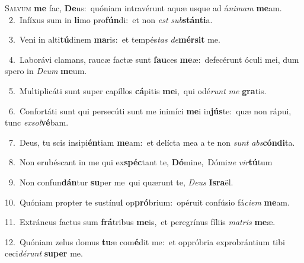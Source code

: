 \lettrine{\initial\textcolor{\initialcolor}{S}}{alvum} \textbf{me} fac, \textbf{De}\-us:~\star quóniam intravérunt aquæ usque ad á\-\textit{ni}\-\textit{mam} \textbf{me}\-am.\\
{\numbfont\textcolor{\numbcolor}{~2.}}~Infíxus sum in \textbf{li}\-mo pro\-\textbf{fún}\-di:~\star et non \textit{est} \textit{sub}\-\textbf{stán}\textbf{ti}a.\par
{\numbfont\textcolor{\numbcolor}{~3.}}~Veni in alti\-\textbf{tú}\-dinem \textbf{ma}\-ris:~\star et tempés\textit{tas} \textit{de}\-\textbf{mér}\textbf{sit} me.\par
{\numbfont\textcolor{\numbcolor}{~4.}}~Laborávi clamans, raucæ factæ sunt \textbf{fau}\-ces \textbf{me}\-æ:~\star defecérunt óculi mei, dum spero in \textit{De}\-\textit{um} \textbf{me}\-um.\par
{\numbfont\textcolor{\numbcolor}{~5.}}~Multiplicáti sunt super capíllos \textbf{cá}\-pitis \textbf{me}\-i,~\star qui odé\textit{runt} \textit{me} \textbf{gra}\-tis.\par
{\numbfont\textcolor{\numbcolor}{~6.}}~Confortáti sunt qui persecúti sunt me inimíci \textbf{me}\-i in\-\textbf{jús}\-te:~\star quæ non rápui, tunc \textit{ex}\-\textit{sol}\textbf{vé}bam.\par
{\numbfont\textcolor{\numbcolor}{~7.}}~Deus, tu scis insipi\-\textbf{én}\-tiam \textbf{me}\-am:~\star et delícta mea a te non \textit{sunt} \textit{abs}\-\textbf{cón}\textbf{di}ta.\par
{\numbfont\textcolor{\numbcolor}{~8.}}~Non erubéscant in me qui ex\-\textbf{spéc}\-tant te, \textbf{Dó}\-mine,~\star Dómi\textit{ne} \textit{vir}\-\textbf{tú}tum\par
{\numbfont\textcolor{\numbcolor}{~9.}}~Non confun\-\textbf{dán}\-tur \textbf{su}\-per me~\star qui quærunt te, \textit{De}\-\textit{us} \textbf{Is}\-\textbf{ra}ël.\par
{\numbfont\textcolor{\numbcolor}{10.}}~Quóniam propter te sustínu\textbf{i} op\-\textbf{pró}\-brium:~\star opéruit confúsio fá\-\textit{ci}\-\textit{em} \textbf{me}\-am.\par
{\numbfont\textcolor{\numbcolor}{11.}}~Extráneus factus sum \textbf{frá}\-tribus \textbf{me}\-is,~\star et peregrínus fíliis \textit{ma}\-\textit{tris} \textbf{me}\-æ.\par
{\numbfont\textcolor{\numbcolor}{12.}}~Quóniam zelus domus \textbf{tu}\-æ com\-\textbf{é}\-dit me:~\star et oppróbria exprobrántium tibi ceci\-\textit{dé}\-\textit{runt} \textbf{su}\-\textbf{per} me.\par
